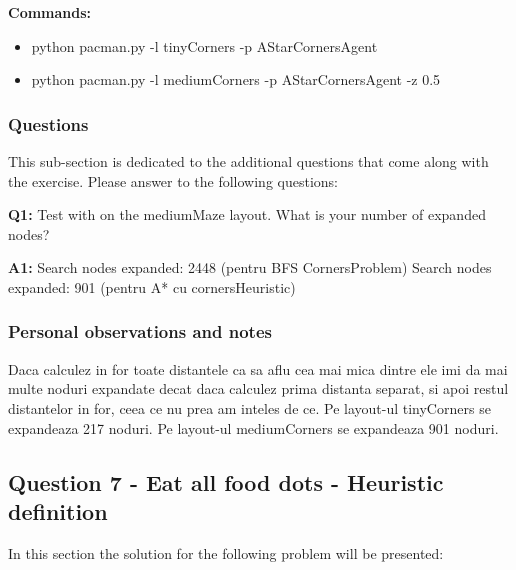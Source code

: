 \textbf{Commands:}
\begin{itemize}
    \setlength\itemsep{0em}
\item python pacman.py -l tinyCorners -p AStarCornersAgent
    \item  python pacman.py -l mediumCorners -p AStarCornersAgent -z 0.5 %
        
\end{itemize}

\subsubsection{Questions}
This sub-section is dedicated to the additional questions that come along with the exercise. Please answer to the following questions:\newline


\textbf{Q1:} Test  with  on the mediumMaze layout. What is your number of expanded nodes?

\textbf{A1:} Search nodes expanded: 2448 (pentru BFS CornersProblem)
\newline
Search nodes expanded: 901 (pentru A* cu cornersHeuristic) %


\subsubsection{Personal observations and notes}
Daca calculez in for toate distantele ca sa aflu cea mai mica dintre ele imi da mai multe noduri expandate decat daca calculez prima distanta separat, si apoi restul distantelor in for, ceea ce nu prea am inteles de ce. \newline
Pe layout-ul tinyCorners se expandeaza 217 noduri. \newline
Pe layout-ul mediumCorners se expandeaza 901 noduri. 

\subsection{Question 7 - Eat all food dots - Heuristic definition}
In this section the solution for the following problem will be presented: \newline


